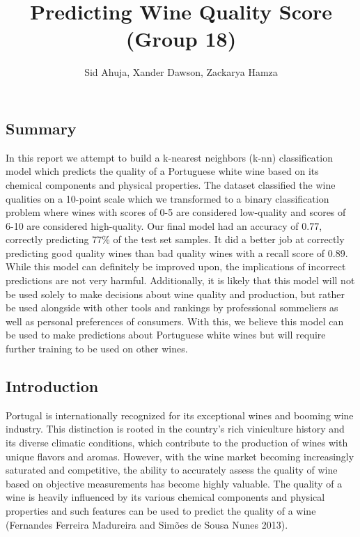 \documentclass[
  letterpaper,
  DIV=11,
  numbers=noendperiod]{scrartcl}
\title{Predicting Wine Quality Score (Group 18)}
\author{Sid Ahuja, Xander Dawson, Zackarya Hamza}
\date{}
\renewcommand*\contentsname{Table of contents}
\newcommand\contentsname{Table of contents}
\begin{document}
\maketitle

\renewcommand*\contentsname{Table of contents}
{
\hypersetup{linkcolor=}
\setcounter{tocdepth}{3}
\tableofcontents
}
\subsection{Summary}\label{summary}

In this report we attempt to build a k-nearest neighbors (k-nn)
classification model which predicts the quality of a Portuguese white
wine based on its chemical components and physical properties. The
dataset classified the wine qualities on a 10-point scale which we
transformed to a binary classification problem where wines with scores
of 0-5 are considered low-quality and scores of 6-10 are considered
high-quality. Our final model had an accuracy of 0.77, correctly
predicting 77\% of the test set samples. It did a better job at
correctly predicting good quality wines than bad quality wines with a
recall score of 0.89. While this model can definitely be improved upon,
the implications of incorrect predictions are not very harmful.
Additionally, it is likely that this model will not be used solely to
make decisions about wine quality and production, but rather be used
alongside with other tools and rankings by professional sommeliers as
well as personal preferences of consumers. With this, we believe this
model can be used to make predictions about Portuguese white wines but
will require further training to be used on other wines.

\subsection{Introduction}\label{introduction}

Portugal is internationally recognized for its exceptional wines and
booming wine industry. This distinction is rooted in the country's rich
viniculture history and its diverse climatic conditions, which
contribute to the production of wines with unique flavors and aromas.
However, with the wine market becoming increasingly saturated and
competitive, the ability to accurately assess the quality of wine based
on objective measurements has become highly valuable. The quality of a
wine is heavily influenced by its various chemical components and
physical properties and such features can be used to predict the quality
of a wine (Fernandes Ferreira Madureira and Simões de Sousa Nunes 2013).
\end{document}
